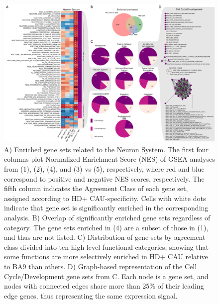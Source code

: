 \documentclass[fleqn,10pt,table]{wlscirep}
\newcommand{\attn}[1]{\colorbox{red}{#1}}
\newcommand{\todo}[1]{\colorbox{yellow}{#1}}
\begin{document}
\begin{figure}
\centering
\includegraphics[width=\linewidth]{bigfig_annot.png}
\caption{A) Enriched gene sets related to the Neuron System.
The first four columns plot Normalized Enrichment Score (NES) of GSEA analyses from (1), (2), (4), and (3) vs (5), respectively, where red and blue correspond to positive and negative NES scores, respectively.
The fifth column indicates the Agreement Class of each gene set, assigned according to HD+ CAU-specificity.
Cells with white dots indicate that gene set is significantly enriched in the corresponding analysis.
B) Overlap of significantly enriched gene sets regardless of category.
The gene sets enriched in (4) are a subset of those in (1), and thus are not listed.
C) Distribution of gene sets by agreement class divided into ten high level functional categories, showing that some functions are more selectively enriched in HD+ CAU relative to BA9 than others.
D) Graph-based representation of the Cell Cycle/Development gene sets from C. Each node is a gene set, and nodes with connected edges share more than 25\% of their leading edge genes, thus representing the same expression signal.\label{fig:cau_ba9_gtex}}
\end{figure}
\end{document}
